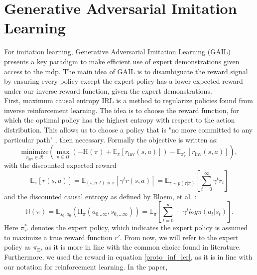 \chapter{Generative Adversarial Imitation Learning}
\label{app:GAIL}
For imitation learning, Generative Adversarial Imitation Learning (GAIL) 
\cite{ho2016generative} presents a key paradigm to make efficient use of expert demonstrations given access to the \ac{mdp}. 
The main idea of GAIL is to disambiguate the reward signal 
by ensuring every policy except the expert policy has a lower expected reward under our inverse reward function, given the expert 
demonstrations.\\ 
First, 
maximum causal entropy IRL \cite{10.5555/3104322.3104481} is a method to regularize policies found from inverse reinforcement learning. The idea is to choose the reward function, for 
which the optimal policy has the highest entropy with respect to the action distribution. This allows us to choose a policy that is "no more committed to any 
particular path" \cite[p.2]{10.5555/3104322.3104481}, then necessary. Formally the objective is written as:
\begin{equation*}
    \label{proto_inf_ler}
    \underset{r_{\text{inv}} \in \mathcal{R}}{\text{minimize}} \left( \max_{\pi \in \Pi} \left( - \text{H}(\pi) + \mathbb{E}_{\pi}[r_{\text{inv}}(s, a)] \right) - \mathbb{E}_{\pi_{r'}^*}[r_{\text{inv}}(s,a)] \right),
\end{equation*}
with the discounted expected reward
\begin{equation*}
    \mathbb{E}_{\pi}[r(s, a)] =
    \mathbb{E}_{(s,a,t) \propto \pi}[\gamma^t r(s,a)] = 
    \mathbb{E}_{\tau \sim p(\tau | \pi)} \left[ \sum_{t=0}^\infty \gamma^t r_t \right]
\end{equation*}
and the discounted causal entropy as defined by Bloem, et al. \cite{InfCausalEnt}:
\begin{equation*}
    \mathbb{H}(\pi) = \mathbb{E}_{s_0, a_0} \left(\text{H}_{\pi}(a_{0...\infty}, s_{0,...\infty})\right) = \mathbb{E}_{\pi}\left[\sum_{t=0}^\infty -\gamma^t log \pi(a_t|s_t)\right].
\end{equation*}
Here $\pi_{r'}^*$ denotes the expert policy, which indicates the expert policy is assumed to maximize a true 
reward function ${r'}$. From now, we will refer to the expert policy as $\pi_{\text{E}}$, as it is more in line with the common choice found in 
literature. Furthermore, we used the reward in equation  \ref{proto_inf_ler}, as it is in line with our notation for reinforcement learning. In the paper, 
